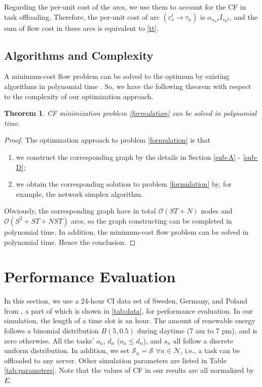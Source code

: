 \documentclass[conference, 10pt, ﬁnal, letterpaper, twocolumn]{IEEEtran}
\newtheorem{theorem}{Theorem}
\begin{document}
Regarding the per-unit cost of the arcs, we use them to account for the CF in task offloading. Therefore, the per-unit cost of arc $(\varepsilon^{t}_{s}\rightarrow\tau_n)$ is $\alpha_{s_{n}s}I_{s_{n}t}$, and the sum of flow cost in these arcs is equivalent to \eqref{tt}.

\subsection{Algorithms and Complexity}

A minimum-cost flow problem can be solved to the optimum by existing algorithms in polynomial time \cite{10.5555/137406}. So, we have the following theorem with respect to the complexity of our optimization approach.

\begin{theorem}
CF minimization problem \eqref{formulation} can be solved in polynomial time.
\end{theorem}
\begin{proof}
The optimization approach to problem \eqref{formulation} is that 
\begin{enumerate}
    \item we construct the corresponding graph by the details in Section \ref{sub-A} - \ref{sub-D};
    \item we obtain the corresponding solution to problem \eqref{formulation} by, for example, the network simplex algorithm. 
\end{enumerate}
Obviously, the corresponding graph have in total $\mathcal{O}(ST + N)$ nodes and $\mathcal{O}(S^2 +ST + NST)$ arcs, so the graph constructing can be completed in polynomial time. In addition, the minimum-cost flow problem can be solved in polynomial time. Hence the conclusion.
\end{proof}






\section{Performance Evaluation}

In this section, we use a 24-hour CI data set of Sweden, Germany, and Poland from \cite{ElectricityMaps}, a part of which is shown in \ref{tab:data}, for performance evaluation. In our simulation, the length of a time slot is an hour. The amount of renewable energy follows a binomial distribution $B(5, 0.5)$ during daytime (7 am to 7 pm), and is zero otherwise. All the tasks' $o_{n}$, $d_n$ ($o_n \leq d_n$), and $s_n$ all follow a discrete uniform distribution. In addition, we set $\mathcal{S}_n = \mathcal{S}$ $\forall n \in \mathcal{N}$, i.e., a task can be offloaded to any server. Other simulation parameters are listed in Table \ref{tab:parameters}. Note that the values of CF in our results are all normalized by $E$. 
\end{document}
